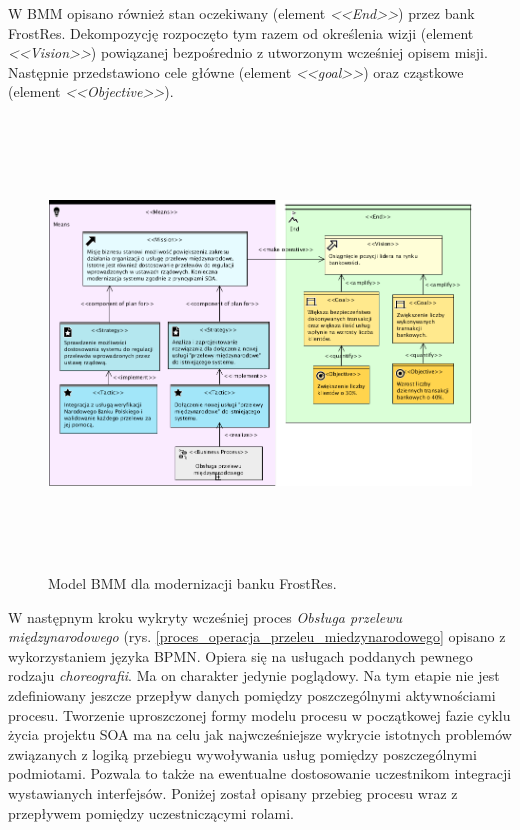 W BMM opisano również stan oczekiwany (element \emph{<<End>>}) przez bank FrostRes. Dekompozycję rozpoczęto tym razem od określenia wizji (element \emph{<<Vision>>}) powiązanej bezpośrednio z utworzonym wcześniej opisem misji. Następnie przedstawiono cele główne (element \emph{<<goal>>}) oraz cząstkowe (element \emph{<<Objective>>}).

\begin{figure}[h!tbp]
\begin{centering}
\includegraphics[width=16cm, height=12cm]{img/bmm_model_frostres.png}
\caption[Model BMM dla modernizacji banku FrostRes]{Model BMM dla modernizacji banku FrostRes.}\label{BMM_frostres}
\end{centering}
\end{figure}

W następnym kroku wykryty wcześniej proces \emph{Obsługa przelewu międzynarodowego} (rys. \ref{proces_operacja_przeleu_miedzynarodowego} opisano z wykorzystaniem języka BPMN. Opiera się na usługach poddanych pewnego rodzaju \emph{choreografii}. Ma on charakter jedynie poglądowy. Na tym etapie nie jest zdefiniowany jeszcze przepływ danych pomiędzy poszczególnymi aktywnościami procesu. Tworzenie uproszczonej formy modelu procesu w początkowej fazie cyklu życia projektu SOA ma na celu jak najwcześniejsze wykrycie istotnych problemów związanych z logiką przebiegu wywoływania usług pomiędzy poszczególnymi podmiotami. Pozwala to także na ewentualne dostosowanie uczestnikom integracji wystawianych interfejsów. Poniżej został opisany przebieg procesu wraz z przepływem pomiędzy uczestniczącymi rolami.

